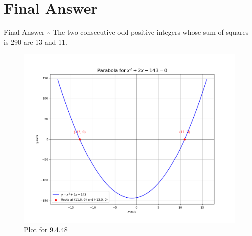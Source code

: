 \documentclass{beamer}
\theoremstyle{remark}
\begin{document}
\section{Final Answer}
\begin{frame}{Final Answer}
$\therefore$ The two consecutive odd positive integers whose sum of squares is 290 are 13 and 11.

\begin{figure}[H]
    \centering
    \includegraphics[width=0.55\columnwidth]{figs/1.png}
    \caption{Plot for 9.4.48}
\end{figure}
\end{frame}
\end{document}
